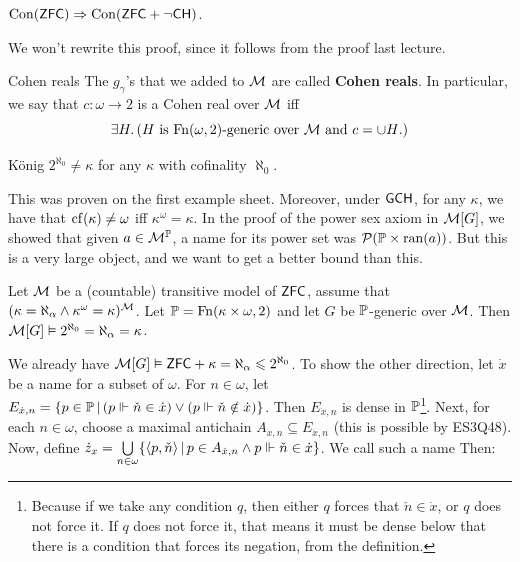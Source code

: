 \documentclass{article}
\begin{document}
    \begin{fancythm}{}
        $\operatorname{Con}(\mathsf{ZFC}) \Rightarrow \operatorname{Con}(\mathsf{ZFC} + \neg \mathsf{CH})$.
    \end{fancythm}
    \proof We won't rewrite this proof, since it follows from the proof last lecture. \endproof
    \begin{fancydefine}{Cohen reals}
        The $g_{\gamma}$'s that we added to $\mathcal{M}$ are called \textbf{Cohen reals}.\gap
        In particular, we say that $c : \omega \to 2$ is a Cohen real over $\mathcal{M}$ iff \[ \exists H. \, (H \text{ is $\operatorname{Fn}(\omega, 2)$-generic over $\mathcal{M}$ and $c = \cup H$.})\]
    \end{fancydefine}
    \begin{fancyprop}{K\"onig}
        $2^{\aleph_{0}} \neq \kappa$ for any $\kappa$ with cofinality $\aleph_{0}$.
    \end{fancyprop}
    \proof This was proven on the first example sheet. \endproof
    Moreover, under $\mathsf{GCH}$, for any $\kappa$, we have that $\operatorname{cf}(\kappa) \neq \omega$ iff $\kappa^{\omega}=\kappa$.\gap
    In the proof of the power sex axiom in $\mathcal{M}[G]$, we showed that given $a \in \mathcal{M}^{\mathbb{P}}$, a name for its power set was $\mathcal{P}(\mathbb{P} \times \operatorname{ran}(a))$. But this is a very large object, and we want to get a better bound than this.
    \begin{fancythm}{}
        Let $\mathcal{M}$ be a (countable) transitive model of $\mathsf{ZFC}$, assume that $(\kappa = \aleph_{\alpha} \wedge \kappa^{\omega}=\kappa)^{\mathcal{M}}$. Let $\mathbb{P} = \operatorname{Fn}(\kappa \times \omega, 2)$ and let $G$ be $\mathbb{P}$-generic over $\mathcal{M}$. Then $\mathcal{M}[G] \vDash 2^{\aleph_{0}}=\aleph_{\alpha}=\kappa$.
    \end{fancythm}
    \proof We already have $\mathcal{M}[G] \vDash \mathsf{ZFC} + \kappa=\aleph_{\alpha}\leqslant 2^{\aleph_{0}}$. \gap
    To show the other direction, let $\dot{x}$ be a name for a subset of $\omega$. For $n \in \omega$, let $E_{\dot{x},n} = \{ p \in \mathbb{P} \, | \, (p \Vdash \check{n} \in \dot{x}) \vee (p \Vdash \check{n} \notin \dot{x}) \}$. Then $E_{\dot{x},n}$ is dense in $\mathbb{P}$\footnote{Because if we take any condition $q$, then either $q$ forces that $\check{n} \in \dot{x}$, or $q$ does not force it. If $q$ does not force it, that means it must be dense below that there is a condition that forces its negation, from the definition.}. Next, for each $n \in \omega$, choose a maximal antichain $A_{\dot{x},n} \subseteq E_{\dot{x},n}$ (this is possible by ES3Q48). \gap
    Now, define $\dot{z}_{x} = \bigcup\limits_{n \in \omega} \{ \langle p, \check{n} \rangle \, | \, p \in A_{\dot{x},n} \wedge p \Vdash \check{n} \in \dot{x} \}$. We call such a name  Then: \gap
\end{document}
